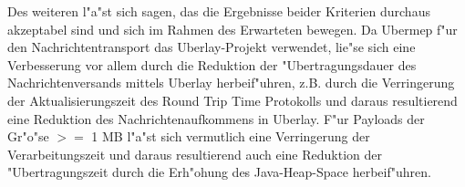 
Des weiteren l"a"st sich sagen, das die Ergebnisse beider Kriterien durchaus akzeptabel sind und sich im Rahmen des Erwarteten bewegen. Da Ubermep f"ur den Nachrichtentransport das Uberlay-Projekt verwendet, lie"se sich eine Verbesserung vor allem durch die Reduktion der "Uber\-tra\-gungs\-dauer des Nachrichtenversands mittels Uberlay herbeif"uhren, z.B. durch die Verringerung der Aktualisierungszeit des Round Trip Time Protokolls und daraus resultierend eine Reduktion des Nachrichtenaufkommens in Uberlay. F"ur Payloads der Gr"o"se $>=$ 1 MB l"a"st sich vermutlich eine Verringerung der Verarbeitungszeit und daraus resultierend auch eine Reduktion der "Ubertragungszeit durch die Erh"ohung des Java-Heap-Space herbeif"uhren.




